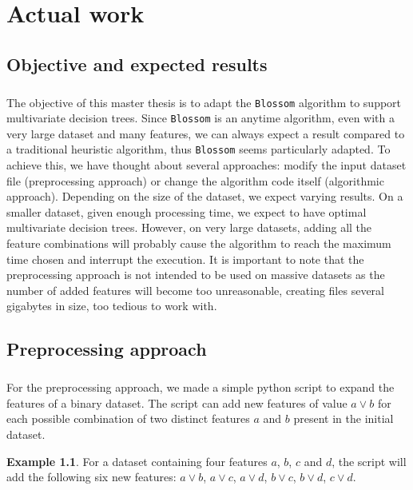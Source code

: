 \documentclass[12pt]{report}
\theoremstyle{definition}
\newtheorem*{example}{Example}
\theoremstyle{definition}
\theoremstyle{definition}
\begin{document}
\chapter{Actual work}
\section{Objective and expected results}
\paragraph{} The objective of this master thesis is to adapt the \texttt{Blossom} algorithm to support multivariate
decision trees. Since \texttt{Blossom} is an anytime algorithm, even with a very large dataset and many features,
we can always expect a result compared to a traditional heuristic algorithm, thus \texttt{Blossom} seems particularly
adapted. To achieve this, we have thought about several approaches: modify the input dataset file (preprocessing approach)
or change the algorithm code itself (algorithmic approach). Depending on the size of the dataset, we expect varying results.
On a smaller dataset, given enough processing time, we expect to have optimal multivariate decision trees. However, on very
large datasets, adding all the feature combinations will probably cause the algorithm to reach the maximum time chosen and
interrupt the execution. It is important to note that the preprocessing approach is not intended to be used on massive
datasets as the number of added features will become too unreasonable, creating files several gigabytes in size, too
tedious to work with.


\section{Preprocessing approach}
\paragraph{} For the preprocessing approach, we made a simple python script to expand the features of a binary
dataset. The script can add new features of value $a \lor b$ for each possible combination of two distinct
features $a$ and $b$ present in the initial dataset.

\begin{example}
    For a dataset containing four features $a$, $b$, $c$ and $d$, the script will add the following six new
    features: $a \lor b$, $a \lor c$, $a \lor d$, $b \lor c$, $b \lor d$, $c \lor d$.
\end{example}
\end{document}
